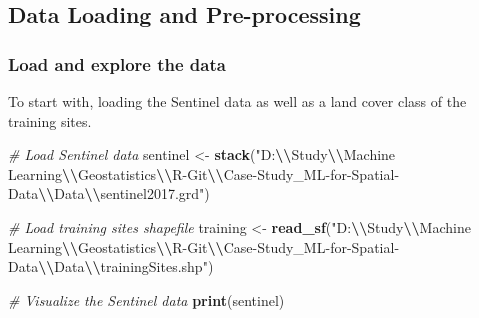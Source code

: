 \documentclass[
]{article}
\newenvironment{Shaded}{\begin{snugshade}}{\end{snugshade}}
\newcommand{\CommentTok}[1]{\textcolor[rgb]{0.56,0.35,0.01}{\textit{#1}}}
\newcommand{\FunctionTok}[1]{\textcolor[rgb]{0.13,0.29,0.53}{\textbf{#1}}}
\newcommand{\NormalTok}[1]{#1}
\newcommand{\OtherTok}[1]{\textcolor[rgb]{0.56,0.35,0.01}{#1}}
\newcommand{\SpecialCharTok}[1]{\textcolor[rgb]{0.81,0.36,0.00}{\textbf{#1}}}
\newcommand{\StringTok}[1]{\textcolor[rgb]{0.31,0.60,0.02}{#1}}
\begin{document}
\subsection{Data Loading and
Pre-processing}\label{data-loading-and-pre-processing}

\subsubsection{Load and explore the
data}\label{load-and-explore-the-data}

To start with, loading the Sentinel data as well as a land cover class
of the training sites.

\begin{Shaded}
\begin{Highlighting}[]
\CommentTok{\# Load Sentinel data}
\NormalTok{sentinel }\OtherTok{\textless{}{-}} \FunctionTok{stack}\NormalTok{(}\StringTok{"D:}\SpecialCharTok{\textbackslash{}\textbackslash{}}\StringTok{Study}\SpecialCharTok{\textbackslash{}\textbackslash{}}\StringTok{Machine Learning}\SpecialCharTok{\textbackslash{}\textbackslash{}}\StringTok{Geostatistics}\SpecialCharTok{\textbackslash{}\textbackslash{}}\StringTok{R{-}Git}\SpecialCharTok{\textbackslash{}\textbackslash{}}\StringTok{Case{-}Study\_ML{-}for{-}Spatial{-}Data}\SpecialCharTok{\textbackslash{}\textbackslash{}}\StringTok{Data}\SpecialCharTok{\textbackslash{}\textbackslash{}}\StringTok{sentinel2017.grd"}\NormalTok{)}

\CommentTok{\# Load training sites shapefile}
\NormalTok{training }\OtherTok{\textless{}{-}} \FunctionTok{read\_sf}\NormalTok{(}\StringTok{"D:}\SpecialCharTok{\textbackslash{}\textbackslash{}}\StringTok{Study}\SpecialCharTok{\textbackslash{}\textbackslash{}}\StringTok{Machine Learning}\SpecialCharTok{\textbackslash{}\textbackslash{}}\StringTok{Geostatistics}\SpecialCharTok{\textbackslash{}\textbackslash{}}\StringTok{R{-}Git}\SpecialCharTok{\textbackslash{}\textbackslash{}}\StringTok{Case{-}Study\_ML{-}for{-}Spatial{-}Data}\SpecialCharTok{\textbackslash{}\textbackslash{}}\StringTok{Data}\SpecialCharTok{\textbackslash{}\textbackslash{}}\StringTok{trainingSites.shp"}\NormalTok{)}

\CommentTok{\# Visualize the Sentinel data}
\FunctionTok{print}\NormalTok{(sentinel)}
\end{Highlighting}
\end{Shaded}
\end{document}
